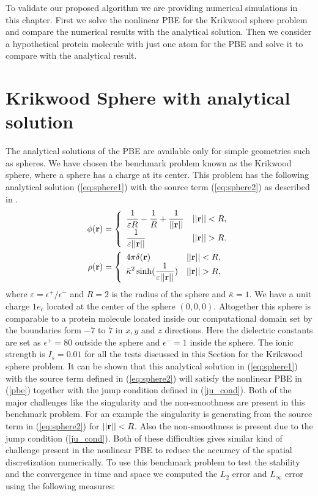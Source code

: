 To validate our proposed algorithm we are providing numerical simulations in this chapter. First we solve the nonlinear PBE for the Krikwood sphere problem and compare the numerical results with the analytical solution. Then we consider a hypothetical protein molecule with just one atom for the PBE and solve it to compare with the analytical result. 


\section{Krikwood Sphere with analytical solution}
\label{krik}

The analytical solutions of the PBE are available only for simple geometries such as spheres. We have chosen the benchmark problem known as the Krikwood sphere, where a sphere has a charge at its center. This problem has the following analytical solution  (\ref{eq:sphere1}) with the source term (\ref{eq:sphere2}) as described in \cite{Geng2013_Fully}. 
\begin{align}
	\phi({\bf r})&=\left\{\begin{array}{lc}\displaystyle\frac{1}{\varepsilon R}-\frac{1}{R}+\displaystyle\frac{1}{||{\bf r}||} & ||{\bf r}||<R, \\
	\displaystyle\frac{1}{\varepsilon ||{\bf r}||}& ||{\bf r}||>R.\end{array}\right.\label{eq:sphere1}\\
	\rho({\bf r})&=\left\{\begin{array}{lc}4\pi \delta ({\bf r)} & ||{\bf r}||<R, \\ \displaystyle\bar{\kappa}^2\sinh (\frac{1}{\varepsilon ||{\bf r}||}) & ||{\bf r}||>R,\end{array}\right.\label{eq:sphere2}
\end{align}
where $\varepsilon=\epsilon^+ / \epsilon^-$ and $R=2$ is the radius of the sphere and $\bar{\kappa}=1$. We have a unit charge $1e_c$ located at the center of the sphere $(0,0,0)$. Altogether this sphere is comparable to a protein molecule located inside our computational domain set by the boundaries form $-7$ to $7$ in $x,y$ and $z$ directions.  Here the dielectric constants are set as $\epsilon^+=80$ outside the sphere and $\epsilon^-=1$ inside the sphere. The ionic strength is $I_s = 0.01$ for all the tests discussed in this Section for the Krikwood sphere problem. It can be shown that this analytical solution in (\ref{eq:sphere1}) with the source term defined in (\ref{eq:sphere2}) will satisfy the nonlinear PBE in (\ref{pbe}) together with the jump condition defined in (\ref{ju_cond}). Both of the major challenges like the singularity and the non-smoothness are present in this benchmark problem. For an example the singularity is generating from the source term in (\ref{eq:sphere2}) for $||{\bf r}|| <R$. Also the non-smoothness is present due to the jump condition (\ref{ju_cond}). Both of these difficulties gives similar kind of challenge present in the nonlinear PBE to reduce the accuracy of the spatial discretization numerically. To use this benchmark problem to test the stability and the convergence in time and space we computed the $L_2$ error and $L_\infty$ error using the following measures: 
